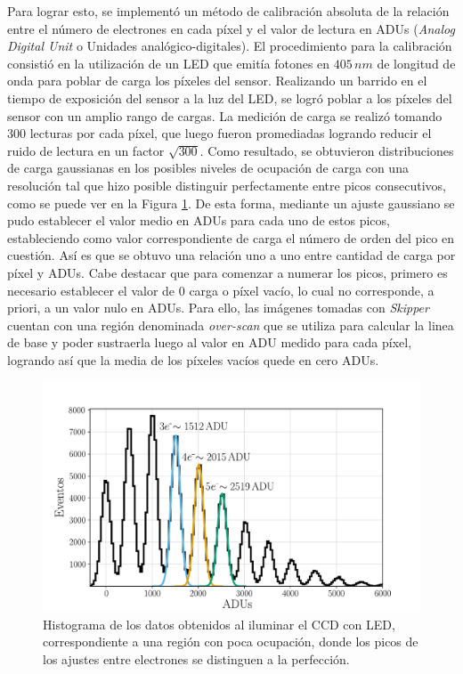 Para lograr esto, se implementó un método de calibración absoluta de la relación entre el número de electrones en cada píxel y el valor de lectura en ADUs (\textit{Analog Digital Unit} o Unidades analógico-digitales). El procedimiento para la calibración consistió en la utilización de un LED que emitía fotones en $405\,\si{nm}$ de longitud de onda para poblar de carga los píxeles del sensor. 
Realizando un barrido en el tiempo de exposición del sensor a la luz del LED, se logró poblar a los píxeles del sensor con un amplio rango de cargas. La medición de carga se realizó tomando $300$ lecturas por cada píxel, que luego fueron promediadas logrando reducir el ruido de lectura en un factor $\sqrt{300}$. 
Como resultado, se obtuvieron distribuciones de carga gaussianas en los posibles niveles de ocupación de carga con una resolución tal que hizo posible distinguir perfectamente entre picos consecutivos, como se puede ver en la Figura \ref{fig:Calibracion}. 
De esta forma, mediante un ajuste gaussiano se pudo establecer el valor medio en ADUs para cada uno de estos picos, estableciendo como valor correspondiente de carga el número de orden del pico en cuestión. 
Así es que se obtuvo una relación uno a uno entre cantidad de carga por píxel y ADUs. Cabe destacar que para comenzar a numerar los picos, primero es necesario establecer el valor de $0$ carga o píxel vacío, lo cual no corresponde, a priori, a un valor nulo en ADUs. 
Para ello, las imágenes tomadas con \textit{Skipper} cuentan con una región denominada \textit{over-scan} que se utiliza para calcular la linea de base y poder sustraerla luego al valor en ADU medido para cada píxel, logrando así que la media de los píxeles vacíos quede en cero ADUs.
\begin{figure}[H]
    \centering
        \includegraphics[scale=0.5]{Figs/ajuste_gaussiano_calibracion.pdf}
    \caption{Histograma de los datos obtenidos al iluminar el CCD con LED, correspondiente a una región con poca ocupación, donde los picos de los ajustes entre electrones se distinguen a la perfección.}
    \label{fig:Calibracion}
\end{figure}
